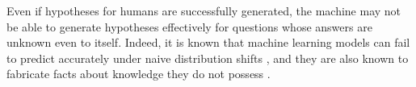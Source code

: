 Even if hypotheses for humans are successfully generated, the machine may not be able to generate hypotheses effectively for questions whose answers are unknown even to itself. Indeed, it is known that machine learning models can fail to predict accurately under naive distribution shifts \cite{shen2021towards}, and they are also known to fabricate facts about knowledge they do not possess \cite{maynez2020faithfulness}.








